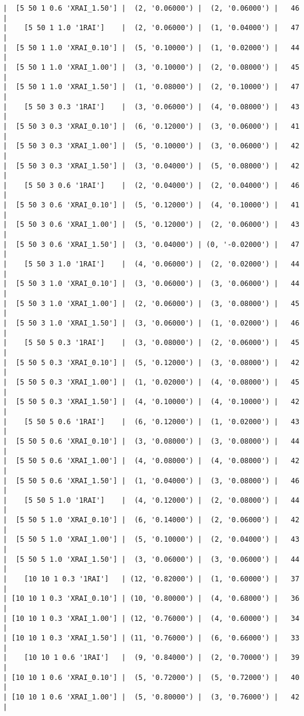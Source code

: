 \documentclass{article}
\begin{document}
\begin{verbatim}
|  [5 50 1 0.6 'XRAI_1.50'] |  (2, '0.06000') |  (2, '0.06000') |   46  |
|    [5 50 1 1.0 '1RAI']    |  (2, '0.06000') |  (1, '0.04000') |   47  |
|  [5 50 1 1.0 'XRAI_0.10'] |  (5, '0.10000') |  (1, '0.02000') |   44  |
|  [5 50 1 1.0 'XRAI_1.00'] |  (3, '0.10000') |  (2, '0.08000') |   45  |
|  [5 50 1 1.0 'XRAI_1.50'] |  (1, '0.08000') |  (2, '0.10000') |   47  |
|    [5 50 3 0.3 '1RAI']    |  (3, '0.06000') |  (4, '0.08000') |   43  |
|  [5 50 3 0.3 'XRAI_0.10'] |  (6, '0.12000') |  (3, '0.06000') |   41  |
|  [5 50 3 0.3 'XRAI_1.00'] |  (5, '0.10000') |  (3, '0.06000') |   42  |
|  [5 50 3 0.3 'XRAI_1.50'] |  (3, '0.04000') |  (5, '0.08000') |   42  |
|    [5 50 3 0.6 '1RAI']    |  (2, '0.04000') |  (2, '0.04000') |   46  |
|  [5 50 3 0.6 'XRAI_0.10'] |  (5, '0.12000') |  (4, '0.10000') |   41  |
|  [5 50 3 0.6 'XRAI_1.00'] |  (5, '0.12000') |  (2, '0.06000') |   43  |
|  [5 50 3 0.6 'XRAI_1.50'] |  (3, '0.04000') | (0, '-0.02000') |   47  |
|    [5 50 3 1.0 '1RAI']    |  (4, '0.06000') |  (2, '0.02000') |   44  |
|  [5 50 3 1.0 'XRAI_0.10'] |  (3, '0.06000') |  (3, '0.06000') |   44  |
|  [5 50 3 1.0 'XRAI_1.00'] |  (2, '0.06000') |  (3, '0.08000') |   45  |
|  [5 50 3 1.0 'XRAI_1.50'] |  (3, '0.06000') |  (1, '0.02000') |   46  |
|    [5 50 5 0.3 '1RAI']    |  (3, '0.08000') |  (2, '0.06000') |   45  |
|  [5 50 5 0.3 'XRAI_0.10'] |  (5, '0.12000') |  (3, '0.08000') |   42  |
|  [5 50 5 0.3 'XRAI_1.00'] |  (1, '0.02000') |  (4, '0.08000') |   45  |
|  [5 50 5 0.3 'XRAI_1.50'] |  (4, '0.10000') |  (4, '0.10000') |   42  |
|    [5 50 5 0.6 '1RAI']    |  (6, '0.12000') |  (1, '0.02000') |   43  |
|  [5 50 5 0.6 'XRAI_0.10'] |  (3, '0.08000') |  (3, '0.08000') |   44  |
|  [5 50 5 0.6 'XRAI_1.00'] |  (4, '0.08000') |  (4, '0.08000') |   42  |
|  [5 50 5 0.6 'XRAI_1.50'] |  (1, '0.04000') |  (3, '0.08000') |   46  |
|    [5 50 5 1.0 '1RAI']    |  (4, '0.12000') |  (2, '0.08000') |   44  |
|  [5 50 5 1.0 'XRAI_0.10'] |  (6, '0.14000') |  (2, '0.06000') |   42  |
|  [5 50 5 1.0 'XRAI_1.00'] |  (5, '0.10000') |  (2, '0.04000') |   43  |
|  [5 50 5 1.0 'XRAI_1.50'] |  (3, '0.06000') |  (3, '0.06000') |   44  |
|    [10 10 1 0.3 '1RAI']   | (12, '0.82000') |  (1, '0.60000') |   37  |
| [10 10 1 0.3 'XRAI_0.10'] | (10, '0.80000') |  (4, '0.68000') |   36  |
| [10 10 1 0.3 'XRAI_1.00'] | (12, '0.76000') |  (4, '0.60000') |   34  |
| [10 10 1 0.3 'XRAI_1.50'] | (11, '0.76000') |  (6, '0.66000') |   33  |
|    [10 10 1 0.6 '1RAI']   |  (9, '0.84000') |  (2, '0.70000') |   39  |
| [10 10 1 0.6 'XRAI_0.10'] |  (5, '0.72000') |  (5, '0.72000') |   40  |
| [10 10 1 0.6 'XRAI_1.00'] |  (5, '0.80000') |  (3, '0.76000') |   42  |

\end{verbatim}
\end{document}
